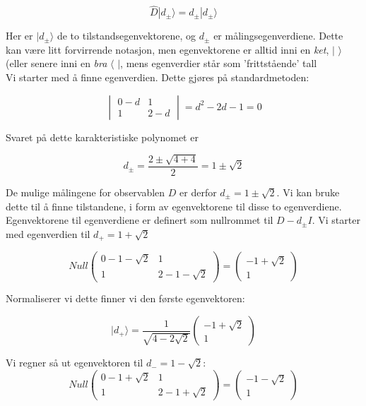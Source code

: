 \documentclass[a4paper,norsk, 10pt]{article}
\numberwithin{equation}{section}
\begin{document}
$$
\hat{D}|d_{\pm}\rangle = d_{\pm}|d_{\pm}\rangle
$$

Her er $|d_{\pm}\rangle$ de to tilstandsegenvektorene, og $d_{\pm}$ er målingsegenverdiene. Dette kan være litt forvirrende notasjon, men egenvektorene er alltid inni en \textit{ket}, $|$ $\rangle$(eller senere inni en \textit{bra} $\langle$ $|$, mens egenverdier står som  'frittstående' tall\\

Vi starter med å finne egenverdien. Dette gjøres på standardmetoden:

$$
\begin{vmatrix}
0 - d & 1\\
1 & 2-d
\end{vmatrix}
= d^2 - 2d - 1 = 0
$$

Svaret på dette karakteristiske polynomet er 

$$
d_{\pm} = \frac{2 \pm \sqrt{4 + 4}}{2} = 1\pm \sqrt{2}
$$

De mulige målingene for observablen $D$ er derfor $d_{\pm} = 1 \pm \sqrt{2}$. Vi kan bruke dette til å finne tilstandene, i form av egenvektorene til disse to egenverdiene. Egenvektorene til egenverdiene er definert som nullrommet til $D - d_{\pm}I$. Vi starter med egenverdien til $d_+ = 1 + \sqrt{2}$

$$
Null
\begin{pmatrix}
0 -1 - \sqrt{2} & 1\\
1 & 2 -1 - \sqrt{2}
\end{pmatrix}
= 
\begin{pmatrix}
-1 + \sqrt{2}\\
1
\end{pmatrix}
$$

Normaliserer vi dette finner vi den første egenvektoren:

\begin{equation}
|d_+\rangle = \frac{1}{\sqrt{4-2\sqrt{2}}}
\begin{pmatrix}
-1 + \sqrt{2}\\
1
\end{pmatrix}
\label{eq:d+}
\end{equation}


Vi regner så ut egenvektoren til $d_- = 1-\sqrt{2}$:
$$
Null
\begin{pmatrix}
0 -1 + \sqrt{2} & 1\\
1 & 2 -1 + \sqrt{2}
\end{pmatrix}
= 
\begin{pmatrix}
-1 - \sqrt{2}\\
1
\end{pmatrix}
$$
\end{document}
